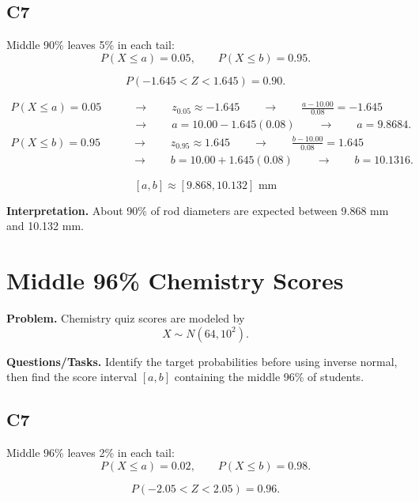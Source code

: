 	\subsection*{C7}
	
	Middle 90\% leaves 5\% in each tail:
	\[
	P(X \leq a) = 0.05, \qquad P(X \leq b) = 0.95.
	\]
	
	\[
	P(-1.645<Z<1.645)=0.90.
	\]
	
	
	\[
	\begin{aligned}
	P(X \leq a)=0.05
	&\qquad \longrightarrow \qquad z_{0.05}\approx -1.645
	\qquad \longrightarrow \qquad \frac{a-10.00}{0.08}=-1.645\\
	&\qquad \longrightarrow \qquad a=10.00-1.645(0.08)
	\qquad \longrightarrow \qquad a=9.8684.
	\end{aligned}
	\]
	\[
	\begin{aligned}
	P(X \leq b)=0.95
	&\qquad \longrightarrow \qquad z_{0.95}\approx 1.645
	\qquad \longrightarrow \qquad \frac{b-10.00}{0.08}=1.645\\
	&\qquad \longrightarrow \qquad b=10.00+1.645(0.08)
	\qquad \longrightarrow \qquad b=10.1316.
	\end{aligned}
	\]
	
	\[
	[a,b] \approx [9.868, 10.132]\text{ mm}
	\]
	
	\textbf{Interpretation.} About 90\% of rod diameters are expected between 9.868 mm and 10.132 mm.
	
	\section{Middle 96\% Chemistry Scores}
	
	\textbf{Problem.} Chemistry quiz scores are modeled by
	\[
	X \sim N(64, 10^2).
	\]
	
	\textbf{Questions/Tasks.} Identify the target probabilities before using inverse normal, then find the score interval $[a,b]$ containing the middle 96\% of students.
	
	\subsection*{C7}
	
	Middle 96\% leaves 2\% in each tail:
	\[
	P(X \leq a) = 0.02, \qquad P(X \leq b) = 0.98.
	\]
	
	\[
	P(-2.05<Z<2.05)=0.96.
	\]
	
